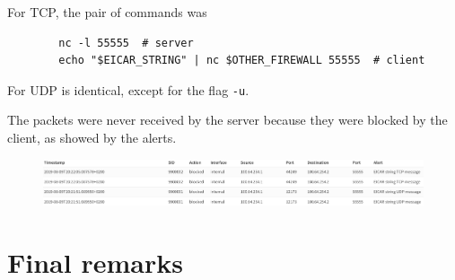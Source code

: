 \documentclass[draft]{homework}
\begin{document}
    For TCP, the pair of commands was
    \begin{verbatim}
        nc -l 55555  # server
        echo "$EICAR_STRING" | nc $OTHER_FIREWALL 55555  # client
    \end{verbatim}
    For UDP is identical, except for the flag \texttt{-u}.
    
    The packets were never received by the server because they were blocked by the client, as showed by the alerts.
    \begin{figure}[H]
        \centering
        \includegraphics[width=\linewidth]{images/proof}
        \label{fig:proof}
    \end{figure}
    
    
    \section{Final remarks}
\end{document}
